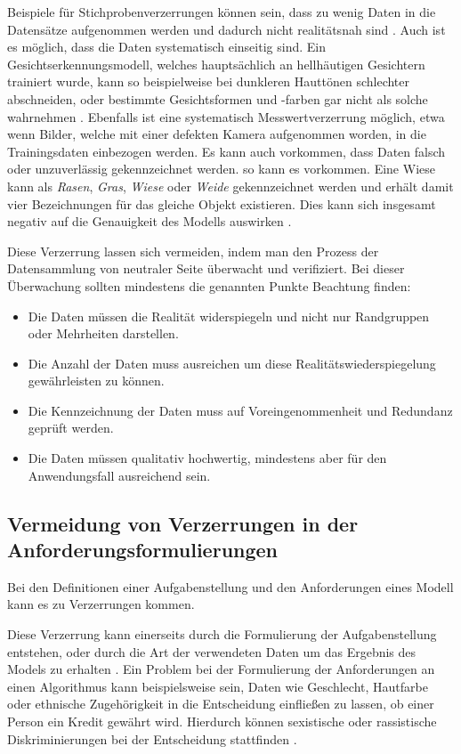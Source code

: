 \documentclass[12pt]{article}
\begin{document}
Beispiele für Stichprobenverzerrungen können sein, dass zu wenig Daten in die Datensätze aufgenommen werden und dadurch nicht realitätsnah sind \cite{Srinivasan}.
Auch ist es möglich, dass die Daten systematisch einseitig sind. Ein Gesichtserkennungsmodell, welches hauptsächlich an hellhäutigen Gesichtern trainiert wurde,
kann so beispielweise bei dunkleren Hauttönen schlechter abschneiden, oder bestimmte Gesichtsformen und -farben gar nicht als solche wahrnehmen \cite{Srinivasan}.
Ebenfalls ist eine systematisch Messwertverzerrung möglich, etwa wenn Bilder, welche mit einer defekten Kamera aufgenommen worden, in die Trainingsdaten einbezogen werden.
Es kann auch vorkommen, dass Daten falsch oder unzuverlässig gekennzeichnet werden. so kann es vorkommen. Eine Wiese kann als \textit{Rasen}, \textit{Gras}, \textit{Wiese} oder \textit{Weide} gekennzeichnet werden und erhält damit vier Bezeichnungen für das gleiche Objekt existieren. Dies kann sich insgesamt negativ auf die Genauigkeit des Modells auswirken \cite{Srinivasan}.

Diese Verzerrung lassen sich vermeiden, indem man den Prozess der Datensammlung von neutraler Seite überwacht und verifiziert.
Bei dieser Überwachung sollten mindestens die genannten Punkte Beachtung finden: 
\begin{itemize}
    \item Die Daten müssen die Realität widerspiegeln und nicht nur Randgruppen oder Mehrheiten darstellen.
    \item Die Anzahl der Daten muss ausreichen um diese Realitätswiederspiegelung gewährleisten zu können.
    \item Die Kennzeichnung der Daten muss auf Voreingenommenheit und Redundanz geprüft werden.
    \item Die Daten müssen qualitativ hochwertig, mindestens aber für den Anwendungsfall ausreichend sein.
\end{itemize}

\subsection{Vermeidung von Verzerrungen in der Anforderungsformulierungen}
Bei den Definitionen einer Aufgabenstellung und den Anforderungen eines Modell kann es zu Verzerrungen kommen.

Diese Verzerrung kann einerseits durch die Formulierung der Aufgabenstellung entstehen, oder durch die Art der verwendeten Daten um das Ergebnis des Models zu erhalten \cite{Srinivasan}.
Ein Problem bei der Formulierung der Anforderungen an einen Algorithmus kann beispielsweise sein, Daten wie Geschlecht, Hautfarbe oder ethnische Zugehörigkeit in die 
Entscheidung einfließen zu lassen, ob einer Person ein Kredit gewährt wird. Hierdurch können sexistische oder rassistische Diskriminierungen bei der Entscheidung stattfinden \cite{Srinivasan}.
\end{document}
